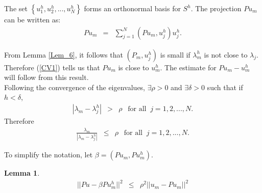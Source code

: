 \documentclass[../../main.tex]{subfiles}
\begin{document}
The set $\left\{u_{1}^{h},u_{2}^{h},...,u_{N}^{h}\right\}$ forms an orthonormal basis for $S^{h}$. The projection $Pu_{m}$ can be written as:
\begin{eqnarray}
	Pu_{m} &=& \sum_{j=1}^{N} ( P u_{m} ,u_{j}^{h}) u_{j}^{h}. \label{CV1}
\end{eqnarray}


From Lemma \ref{Lem_6}, it follows that $( P_{m},u_{j}^{h} )$ is small if $\lambda_{m}^{h}$ is not close to $\lambda_{j}$. Therefore (\ref{CV1}) tells us that $Pu_{m}$ is close to $u_{m}^{h}$. The estimate for $Pu_{m} - u_{m}^{h}$ will follow from this result.\\


Following the convergence of the eigenvalues, $\exists \rho > 0$ and $\exists \delta > 0$ such that if $h<\delta$,
\begin{eqnarray}
|\lambda_{m} - \lambda_{j}^{h}| &>& \rho \ \ \textrm{ for all } \ j = 1,2,...,N.
\end{eqnarray}
Therefore
\begin{eqnarray}
\frac{\lambda_{m}}{|\lambda_{m} - \lambda_{j}^{h}|} &\leq & \rho \ \ \textrm{ for all } \ j = 1,2,...,N.
\end{eqnarray}

To simplify the notation, let $\beta = (Pu_m,Pu_m^h)$.

\newtheorem{Lem_7}[Lem_1]{Lemma} \label{Lem_7}
\begin{Lem_7}
	\begin{eqnarray*}
		||Pu - \beta Pu^h_m||^{2} &\leq & {\rho}^{2} ||u_{m} - Pu_{m}||^{2}
	\end{eqnarray*}
\end{Lem_7}
\begin{comment}
\begin{proof}

Using Lemma \ref{Lem_6}:
\begin{eqnarray*}
||Pu - \beta u_{m}^{h}||^{2} &=& \sum_{j\neq m} \left(\frac{\lambda_{m}}{|\lambda_{m} - \lambda_{j}^{h}|}\right)^{2} ( u_{m} - Pu_{m} ,u_{j}^{h})^{2},\\
				&\leq & \rho^{2} \sum_{j\neq m} ( u_{m} - Pu_{m} ,u_{j}^{h})^{2}, \\
				&\leq & \rho^{2} \sum_{j=1}^{N} ( u_{m} - Pu_{m} ,u_{j}^{h})^{2}, \\
				& = & \rho^{2} ||u_m - Pu_m||^{2}.\\
\end{eqnarray*}
\end{proof}
\end{comment}
\end{document}
